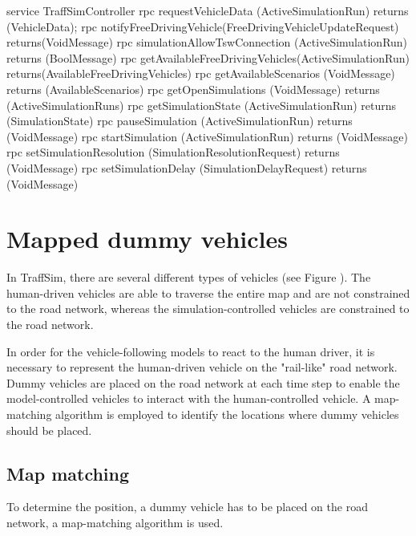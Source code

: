 \begin{minipage}{\textwidth}
\begin{GenericCode}[caption={TraffSim API proto}, label={lst:traffSim-api-proto}]
service TraffSimController {
    rpc requestVehicleData (ActiveSimulationRun)
        returns (VehicleData);
    rpc notifyFreeDrivingVehicle(FreeDrivingVehicleUpdateRequest)
        returns(VoidMessage){}
    rpc simulationAllowTswConnection (ActiveSimulationRun)
        returns (BoolMessage) {}
    rpc getAvailableFreeDrivingVehicles(ActiveSimulationRun)
        returns(AvailableFreeDrivingVehicles){}
    rpc getAvailableScenarios (VoidMessage)
        returns (AvailableScenarios){}
    rpc getOpenSimulations (VoidMessage)
        returns (ActiveSimulationRuns){}
    rpc getSimulationState (ActiveSimulationRun)
        returns (SimulationState){}
    rpc pauseSimulation (ActiveSimulationRun)
        returns (VoidMessage){}
    rpc startSimulation (ActiveSimulationRun)
        returns (VoidMessage){}
    rpc setSimulationResolution (SimulationResolutionRequest)
        returns (VoidMessage){}
    rpc setSimulationDelay (SimulationDelayRequest)
        returns (VoidMessage){}
}\end{GenericCode}
\end{minipage}

\section{Mapped dummy vehicles}\label{sec:mapped-dummy-vehicles}
    In TraffSim, there are several different types of vehicles (see Figure ).%
    The human-driven vehicles are able to traverse the entire map and are not constrained to the road network, whereas the simulation-controlled vehicles are constrained to the road network.

    In order for the vehicle-following models to react to the human driver, it is necessary to represent the human-driven vehicle on the "rail-like" road network.
    Dummy vehicles are placed on the road network at each time step to enable the model-controlled vehicles to interact with the human-controlled vehicle.
    A map-matching algorithm is employed to identify the locations where dummy vehicles should be placed.

    \subsection{Map matching}\label{subsec:map-matching}
        To determine the position, a dummy vehicle has to be placed on the road network, a map-matching algorithm is used.

